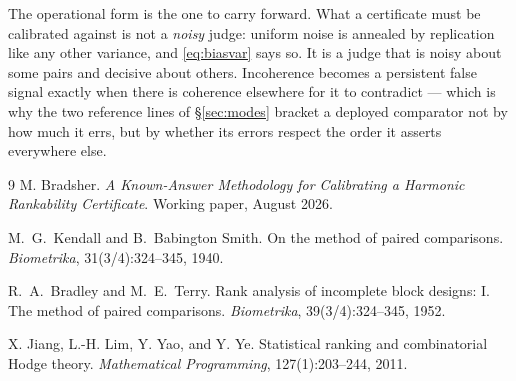 \documentclass[11pt,a4paper]{article}
\theoremstyle{definition}
\theoremstyle{remark}
\begin{document}
The operational form is the one to carry forward. What a certificate must be
calibrated against is not a \emph{noisy} judge: uniform noise is annealed by
replication like any other variance, and \eqref{eq:biasvar} says so. It is a
judge that is noisy about some pairs and decisive about others. Incoherence
becomes a persistent false signal exactly when there is coherence elsewhere for
it to contradict --- which is why the two reference lines of \S\ref{sec:modes} bracket a
deployed comparator not by how much it errs, but by whether its errors respect
the order it asserts everywhere else.

\begin{thebibliography}{9}
M. Bradsher.
\newblock \emph{A Known-Answer Methodology for Calibrating a Harmonic Rankability Certificate}.
\newblock Working paper, August 2026.

M.~G.~Kendall and B.~Babington Smith.
\newblock On the method of paired comparisons.
\newblock \emph{Biometrika}, 31(3/4):324--345, 1940.

R.~A.~Bradley and M.~E.~Terry.
\newblock Rank analysis of incomplete block designs: I. The method of paired
comparisons.
\newblock \emph{Biometrika}, 39(3/4):324--345, 1952.

X. Jiang, L.-H. Lim, Y. Yao, and Y. Ye.
\newblock Statistical ranking and combinatorial Hodge theory.
\newblock \emph{Mathematical Programming}, 127(1):203--244, 2011.
\end{thebibliography}
\end{document}
